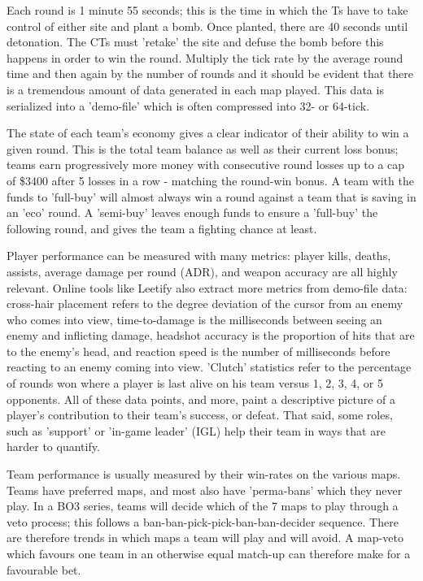 Each round is 1 minute 55 seconds; this is the time in which the Ts have to take control of either site and plant a bomb. Once planted, there are 40 seconds until detonation. The CTs must 'retake' the site and defuse the bomb before this happens in order to win the round. Multiply the tick rate by the average round time and then again by the number of rounds and it should be evident that there is a tremendous amount of data generated in each map played. This data is serialized into a 'demo-file' which is often compressed into 32- or 64-tick.

The state of each team's economy gives a clear indicator of their ability to win a given round. This is the total team balance as well as their current loss bonus; teams earn progressively more money with consecutive round losses up to a cap of \$3400 after 5 losses in a row - matching the round-win bonus. A team with the funds to 'full-buy' will almost always win a round against a team that is saving in an 'eco' round. A 'semi-buy' leaves enough funds to ensure a 'full-buy' the following round, and gives the team a fighting chance at least.

Player performance can be measured with many metrics: player kills, deaths, assists, average damage per round (ADR), and weapon accuracy are all highly relevant. Online tools like Leetify also extract more metrics from demo-file data: cross-hair placement refers to the degree deviation of the cursor from an enemy who comes into view, time-to-damage is the milliseconds between seeing an enemy and inflicting damage, headshot accuracy is the proportion of hits that are to the enemy's head, and reaction speed is the number of milliseconds before reacting to an enemy coming into view. 'Clutch' statistics refer to the percentage of rounds won where a player is last alive on his team versus 1, 2, 3, 4, or 5 opponents. All of these data points, and more, paint a descriptive picture of a player's contribution to their team's success, or defeat. That said, some roles, such as 'support' or 'in-game leader' (IGL) help their team in ways that are harder to quantify.

Team performance is usually measured by their win-rates on the various maps. Teams have preferred maps, and most also have 'perma-bans' which they never play. In a BO3 series, teams will decide which of the 7 maps to play through a veto process; this follows a ban-ban-pick-pick-ban-ban-decider sequence. There are therefore trends in which maps a team will play and will avoid. A map-veto which favours one team in an otherwise equal match-up can therefore make for a favourable bet.

